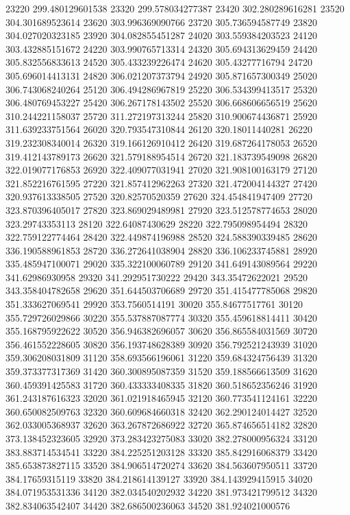 {23220 299.480129601538
23320 299.578034277387
23420 302.280289616281
23520 304.301689523614
23620 303.996369090766
23720 305.736594587749
23820 304.027020323185
23920 304.082855451287
24020 303.559384203523
24120 303.432885151672
24220 303.990765713314
24320 305.694313629459
24420 305.832556833613
24520 305.433239226474
24620 305.43277716794
24720 305.696014413131
24820 306.021207373794
24920 305.871657300349
25020 306.743068240264
25120 306.494286967819
25220 306.534399413517
25320 306.480769453227
25420 306.267178143502
25520 306.668606656519
25620 310.244221158037
25720 311.272197313244
25820 310.900674436871
25920 311.639233751564
26020 320.793547310844
26120 320.18011440281
26220 319.232308340014
26320 319.166126910412
26420 319.687264178053
26520 319.412143789173
26620 321.579188954514
26720 321.183739549098
26820 322.019077176853
26920 322.409077031941
27020 321.908100163179
27120 321.852216761595
27220 321.857412962263
27320 321.472004144327
27420 320.937613338505
27520 320.82570520359
27620 324.454841947409
27720 323.870396405017
27820 323.869029489981
27920 323.512578774653
28020 323.29743353113
28120 322.64087430629
28220 322.795098954494
28320 322.759122774464
28420 322.449874196988
28520 324.588390339485
28620 336.190588961853
28720 336.272641038904
28820 336.106233745881
28920 335.485947100071
29020 335.322100060789
29120 341.649143089564
29220 341.62986930958
29320 341.292951730222
29420 343.35472622021
29520 343.358404782658
29620 351.644503706689
29720 351.415477785068
29820 351.333627069541
29920 353.7560514191
30020 355.84677517761
30120 355.729726029866
30220 355.537887087774
30320 355.459618814411
30420 355.168795922622
30520 356.946382696057
30620 356.865584031569
30720 356.461552228605
30820 356.193748628389
30920 356.792521243939
31020 359.306208031809
31120 358.693566196061
31220 359.684324756439
31320 359.373377317369
31420 360.300895087359
31520 359.188566613509
31620 360.459391425583
31720 360.433333408335
31820 360.518652356246
31920 361.243187616323
32020 361.021918465945
32120 360.773541124161
32220 360.650082509763
32320 360.609684660318
32420 362.290124014427
32520 362.033005368937
32620 363.267872686922
32720 365.874656514182
32820 373.138452323605
32920 373.283423275083
33020 382.278000956324
33120 383.883714534541
33220 384.225251203128
33320 385.842916068379
33420 385.653873827115
33520 384.906514720274
33620 384.563607950511
33720 384.17659315119
33820 384.218614139127
33920 384.143929415915
34020 384.071953531336
34120 382.034540202932
34220 381.973421799512
34320 382.834063542407
34420 382.686500236063
34520 381.924021000576
}
